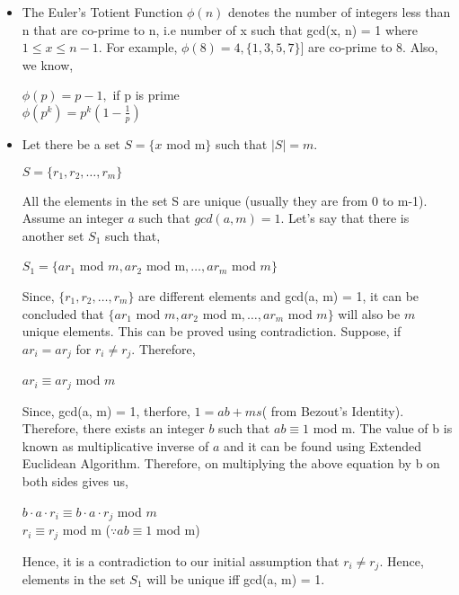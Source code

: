 \documentclass[11pt]{article}
\begin{document}
\begin{itemize}
    \item The Euler's Totient Function $\phi(n)$ denotes the number of integers less than n that are co-prime to n, i.e number of x such that gcd(x, n) = 1 where $1 \leq x \leq n-1$. For example, $\phi(8) = 4, \{1, 3,5,7\}]$ are co-prime to 8. Also, we know,
    \begin{center}
        $\phi(p) = p-1,$ if p is prime\\
        \vspace{1mm}
        $\phi(p^k) = p^k(1 - \frac{1}{p})$
    \end{center}
    \item Let there be a set $S = \{x$ mod m$\}$ such that $|S| = m$.
    \begin{center}
        $S = \{r_1, r_2,\hdots, r_m\}$
    \end{center}
    All the elements in the set S are unique (usually they are from 0 to m-1). Assume an integer $a$ such that $gcd(a, m) = 1$. Let's say that there is another set $S_1$ such that,
    \begin{center}
        $S_1 = \{ar_1$ mod $m, ar_2$ mod m$,\hdots, ar_m$ mod $m\}$
    \end{center}
    Since, $\{r_1, r_2,\hdots, r_m\}$ are different elements and gcd(a, m) = 1, it can be concluded that $\{ar_1$ mod $m, ar_2$ mod m$,\hdots, ar_m$ mod $m\}$ will also be $m$ unique elements. This can be proved using contradiction. Suppose, if $ar_i = ar_j$ for $r_i \neq r_j$. Therefore,
    \begin{center}
        $ar_i \equiv ar_j$ mod $m$
    \end{center}
    Since, gcd(a, m) = 1, therfore, $1 = ab + ms$( from Bezout's Identity). Therefore, there exists an integer $b$ such that $ab \equiv 1$ mod m. The value of b is known as multiplicative inverse of $a$ and it can be found using Extended Euclidean Algorithm.
    Therefore, on multiplying the above equation by b on both sides gives us,
    \begin{center}
        $b\cdot a\cdot r_i \equiv b\cdot a \cdot r_j$ mod $m$\\
        \vspace{3mm}
        $r_i \equiv r_j$ mod m    ($\because ab \equiv 1$ mod m)
    \end{center}
    Hence, it is a contradiction to our initial assumption that $r_i \neq r_j$. Hence, elements in the set $S_1$ will be unique iff gcd(a, m) = 1.

\end{itemize}
\end{document}
